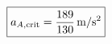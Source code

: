 \documentclass[border=2.5pt]{standalone}
\begin{document}
$\displaystyle \boxed{a_{A,\rm crit}=\frac{189}{130}\,\mathrm{m/s^2}}$
\end{document}
